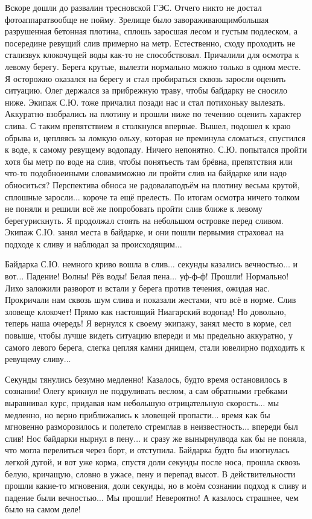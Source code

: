 Вскоре дошли до развалин тресновской ГЭС. Отчего никто не достал фотоаппарат\mdash вообще не пойму. Зрелище было завораживающим\mdash большая разрушенная бетонная плотина, сплошь заросшая лесом и густым подлеском, а посередине ревущий слив примерно на метр. Естественно, сходу проходить не стали\mdash звук клокочущей воды как-то не способствовал. Причалили для осмотра к левому берегу. Берега крутые, вылезти нормально можно только в одном месте. Я осторожно оказался на берегу и стал пробираться сквозь заросли оценить ситуацию. Олег держался за прибрежную траву, чтобы байдарку не сносило ниже. Экипаж С.Ю. тоже причалил позади нас и стал потихоньку вылезать. Аккуратно взобрались на плотину и прошли ниже по течению оценить характер слива. С таким препятствием я столкнулся впервые. Вышел, подошел к краю обрыва и, цепляясь за ломкую ольху, которая не преминула сломаться, спустился к воде, к самому ревущему водопаду. Ничего непонятно. С.Ю. попытался пройти хотя бы метр по воде на слив, чтобы понять\mdash есть там брёвна, препятствия или что-то подобное\mdash иными словами\mdash можно ли пройти слив на байдарке или надо обноситься? Перспектива обноса не радовала\mdash подъём на плотину весьма крутой, сплошные заросли$\ldots$ короче та ещё прелесть. По итогам осмотра ничего толком не поняли и решили всё же попробовать пройти слив ближе к левому берегу\mdash рискнуть. Я продолжал стоять на небольшом островке перед сливом. Экипаж С.Ю. занял места в байдарке, и они пошли первыми\mdash я страховал на подходе к сливу и наблюдал за происходящим$\ldots$

Байдарка С.Ю. немного криво вошла в слив$\ldots$ секунды казались вечностью$\ldots$ и вот$\ldots$ Падение! Волны! Рёв воды! Белая пена$\ldots$ уф-ф-ф! Прошли! Нормально! Лихо заложили разворот и встали у берега против течения, ожидая нас. Прокричали нам сквозь шум слива и показали жестами, что всё в норме. Слив зловеще клокочет! Прямо как настоящий Ниагарский водопад! Но довольно, теперь наша очередь! Я вернулся к своему экипажу, занял место в корме, сел повыше, чтобы лучше видеть ситуацию впереди и мы предельно аккуратно, у самого левого берега, слегка цепляя камни днищем, стали ювелирно подходить к ревущему сливу$\ldots$
 
Секунды тянулись безумно медленно! Казалось, будто время остановилось в сознании! Олегу крикнул не подруливать веслом, а сам обратными гребками выравнивал курс, придавая нам небольшую отрицательную скорость$\ldots$ мы медленно, но верно приближались к зловещей пропасти$\ldots$ время как бы мгновенно разморозилось и полетело стремглав в неизвестность$\ldots$ впереди был слив! Нос байдарки нырнул в пену$\ldots$ и сразу же вынырнул\mdash вода как бы не поняла, что могла перелиться через борт, и отступила. Байдарка будто бы изогнулась легкой дугой, и вот уже корма, спустя доли секунды после носа, прошла сквозь белую, кричащую, словно в ужасе, пену и перепад высот. В действительности прошли какие-то мгновения, доли секунды, но в моём сознании подход к сливу и падение были вечностью$\ldots$ Мы прошли! Невероятно! А казалось страшнее, чем было на самом деле! 
 
